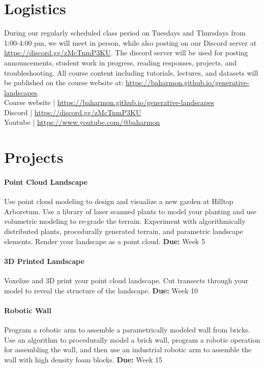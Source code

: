 \documentclass[11pt,article,oneside]{memoir}
\begin{document}
\clearpage

\section{Logistics}

During our regularly scheduled class period
on Tuesdays and Thursdays from 1:00-4:00 pm,
we will meet in person, while also posting
on our Discord server at \url{https://discord.gg/zMcTnmP3KU}.
The discord server will be used for posting
announcements, student work in progress, 
reading responses, projects, and troubleshooting. 
All course content including tutorials, lectures, and datasets
will be published on the course website at:
\url{https://baharmon.github.io/generative-landscapes}.\\

\noindent
Course website | \url{https://baharmon.github.io/generative-landscapes}\\
Discord | \url{https://discord.gg/zMcTnmP3KU}\\
Youtube | \url{https://www.youtube.com/@baharmon}


\section{Projects}

\paragraph{Point Cloud Landscape}
Use point cloud modeling
to design and visualize 
a new garden at Hilltop Arboretum. 
Use a library of laser scanned plants 
to model your planting
and use volumetric modeling
to re-grade the terrain.
Experiment with 
algorithmically distributed plants,
procedurally generated terrain,
and parametric landscape elements. 
Render your landscape
as a point cloud. 
\textbf{Due:} Week 5

\paragraph{3D Printed Landscape}
Voxelize and 3D print 
your point cloud landscape.
Cut transects
through your model
to reveal the structure
of the landscape.
\textbf{Due:} Week 10

\paragraph{Robotic Wall}
Program a robotic arm to assemble 
a parametrically modeled wall
from bricks. 
Use an algorithm to procedurally model a brick wall,
program a robotic operation for assembling the wall,
and then use an industrial robotic arm
to assemble the wall
with high density foam blocks.
\textbf{Due:} Week 15
\end{document}
